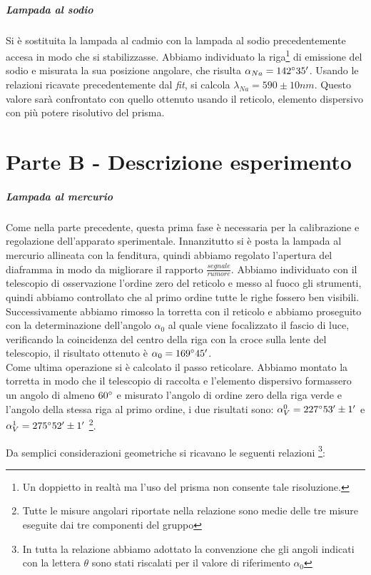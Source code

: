 \documentclass[10pt,a4paper]{article}
\begin{document}
\begin{table}[!htb]
\subparagraph{Lampada al sodio}
Si è sostituita la lampada al cadmio con la lampada al sodio precedentemente accesa in modo che si stabilizzasse. Abbiamo individuato la riga\footnote{Un doppietto in realtà ma l'uso del prisma non consente tale risoluzione.} di emissione del sodio e misurata la sua posizione angolare, che risulta $\alpha_{Na}=142 \degree 35'$. Usando le relazioni ricavate precedentemente dal \emph{fit}, si calcola $\lambda_{Na}=590 \pm 10 nm$. Questo valore sarà confrontato con quello ottenuto usando il reticolo, elemento dispersivo con più potere risolutivo del prisma.\\

\section{Parte B - Descrizione esperimento}
\subparagraph{Lampada al mercurio}
Come nella parte precedente, questa prima fase è necessaria per la calibrazione e regolazione dell'apparato sperimentale. Innanzitutto si è posta la lampada al mercurio allineata con la fenditura, quindi abbiamo regolato l'apertura del diaframma in modo da migliorare il rapporto $\frac{segnale}{rumore}$. Abbiamo individuato con il telescopio di osservazione l'ordine zero del reticolo e messo al fuoco gli strumenti, quindi abbiamo controllato che al primo ordine tutte le righe fossero ben visibili.\\
Successivamente abbiamo rimosso la torretta con il reticolo e abbiamo proseguito con la determinazione dell'angolo $\alpha_0$ al quale viene focalizzato il fascio di luce, verificando la coincidenza del centro della riga con la croce sulla lente del telescopio, il risultato ottenuto è $\alpha_0 = 169 \degree 45 '$.\\
Come ultima operazione si è calcolato il passo reticolare. Abbiamo montato la torretta in modo che il telescopio di raccolta e l'elemento dispersivo formassero un angolo di almeno $60 \degree$ e misurato l'angolo di ordine zero della riga verde e l'angolo della stessa riga al primo ordine, i due risultati sono: $\alpha_V^{0} = 227 \degree 53 ' \pm 1'$ e $\alpha_V^{1} = 275 \degree 52' \pm 1'$ \footnote{Tutte le misure angolari riportate nella relazione sono medie delle tre misure eseguite dai tre componenti del gruppo}.

Da semplici considerazioni geometriche si ricavano le seguenti relazioni \footnote{In tutta la relazione abbiamo adottato la convenzione che gli angoli indicati con la lettera $\theta$ sono stati riscalati per il valore di riferimento $\alpha_0$}:


\end{table}
\end{document}
